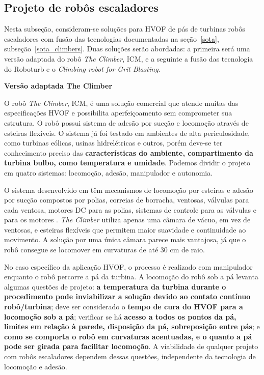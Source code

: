 \subsection{Projeto de robôs escaladores}\label{proj_climbers}

Nesta subseção, consideram-se soluções para HVOF de pás de turbinas robôs
escaladores com fusão das tecnologias documentadas na
seção~\ref{sota}, subseção~\ref{sota_climbers}. Duas soluções serão abordadas:
a primeira será uma versão adaptada do robô \emph{The Climber}, ICM, e a
seguinte a fusão das tecnologia do Roboturb e o \emph{Climbing robot for Grit
Blasting}.

\textbf{Versão adaptada The Climber}  

O robô \emph{The Climber}, ICM, é uma solução comercial que atende muitas das
especificações HVOF e possibilita aperfeiçoamento sem comprometer sua
estrutura. O robô possui sistema de adesão por sucção e locomoção através de
esteiras flexíveis. O sistema já foi testado em ambientes de alta
periculosidade, como turbinas eólicas, usinas hidrelétricas e outros, porém
deve-se ter conhecimento preciso das \textbf{características do ambiente,
compartimento da turbina bulbo, como temperatura e umidade}. Podemos dividir o
projeto em quatro sistemas: locomoção, adesão, manipulador e autonomia.

O sistema desenvolvido em \cite{kim2008development} têm mecanismos de
locomoção por esteiras e adesão por sucção compostos por polias, correias de
borracha, ventosas, válvulas para cada ventosa, motores DC para as polias,
sistemas de controle para as válvulas e para os motores . \emph{The Climber}
utiliza apenas uma câmara de vácuo, em vez de ventosas, e esteiras flexíveis que
permitem maior suavidade e continuidade ao movimento. A solução por uma única
câmara parece mais vantajosa, já que o robô consegue se locomover em curvaturas
de até 30 cm de raio.

No caso específico da aplicação HVOF, o processo é realizado com
manipulador enquanto o robô percorre a pá da turbina. A locomoção do
robô sob a pá levanta algumas questões de projeto: \textbf{a
temperatura da turbina durante o procedimento pode inviabilizar a solução
devido ao contato contínuo robô/turbina}; deve ser considerado o \textbf{tempo
de cura do HVOF para a locomoção sob a pá}; verificar se há \textbf{acesso a
todos os pontos da pá, limites em relação à parede, disposição da pá,
sobreposição entre pás}; e \textbf{como se comporta o robô em curvaturas
acentuadas, e o quanto a pá pode ser girada para facilitar locomoção}. A
viabilidade de qualquer projeto com robôs escaladores dependem dessas questões,
independente da tecnologia de locomoção e adesão.

